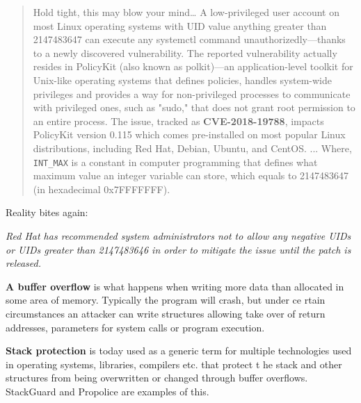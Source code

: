 \documentclass[Screen16to9,17pt]{foils}
\begin{document}
\begin{quote}
Hold tight, this may blow your mind…
A low-privileged user account on most Linux operating systems with UID value anything greater than 2147483647 can execute any systemctl command unauthorizedly—thanks to a newly discovered vulnerability.
The reported vulnerability actually resides in PolicyKit (also known as polkit)—an application-level toolkit for Unix-like operating systems that defines policies, handles system-wide privileges and provides a way for non-privileged processes to communicate with privileged ones, such as "sudo," that does not grant root permission to an entire process.
The issue, tracked as {\bf CVE-2018-19788}, impacts PolicyKit version 0.115 which comes pre-installed on most popular Linux distributions, including Red Hat, Debian, Ubuntu, and CentOS.
...
Where, \verb+INT_MAX+ is a constant in computer programming that defines what maximum value an integer variable can store, which equals to 2147483647 (in hexadecimal 0x7FFFFFFF).
\end{quote}

\begin{list2}
\item Reality bites again:\\
\item \emph{Red Hat has recommended system administrators not to allow any negative UIDs or UIDs greater than 2147483646 in order to mitigate the issue until the patch is released.}
\end{list2}




\begin{list1}
\item {\bfseries A buffer overflow} is what happens when writing more data than allocated in some area of memory. Typically the program will crash, but under ce
rtain circumstances an attacker can write structures allowing take over of return addresses, parameters for system calls or program execution.
\item {\bfseries Stack protection} is today used as a generic term for multiple technologies used in operating systems, libraries, compilers etc. that protect t
he stack and other structures from being overwritten or changed through buffer overflows. StackGuard
and Propolice are examples of this.
\end{list1}
\end{document}
